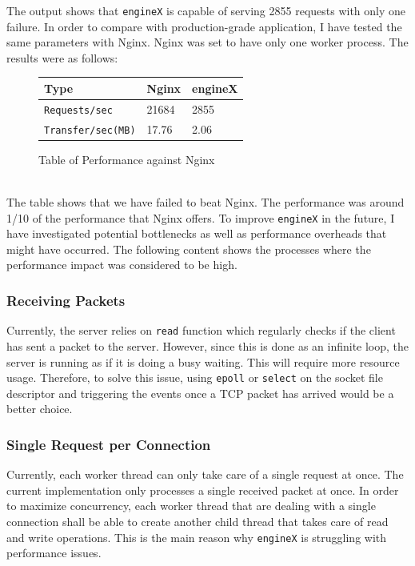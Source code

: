\documentclass{homework}
\begin{document}
The output shows that \texttt{engineX} is capable of serving 2855 requests with only one failure. In order to compare with production-grade application, I have tested the same parameters with Nginx. Nginx was set to have only one worker process. The results were as follows:
\\
\begin{figure}[h]
\begin{center}
\begin{tabular}{|l|l|l|}
    \hline
        \textbf{Type} & \textbf{Nginx} & \textbf{engineX} \\
    \hline
        \texttt{Requests/sec} & 21684 & 2855 \\
        \texttt{Transfer/sec(MB)} & 17.76 & 2.06 \\
    \hline
\end{tabular}
\caption{Table of Performance against Nginx}
\end{center}
\end{figure}
\\
The table shows that we have failed to beat Nginx. The performance was around 1/10 of the performance that Nginx offers. To improve \texttt{engineX} in the future, I have investigated potential bottlenecks as well as performance overheads that might have occurred. The following content shows the processes where the performance impact was considered to be high.

\subsubsection{Receiving Packets}
Currently, the server relies on \texttt{read} function which regularly checks if the client has sent a packet to the server. However, since this is done as an infinite loop, the server is running as if it is doing a busy waiting. This will require more resource usage. Therefore, to solve this issue, using \texttt{epoll} or \texttt{select} on the socket file descriptor and triggering the events once a TCP packet has arrived would be a better choice.

\subsubsection{Single Request per Connection}
Currently, each worker thread can only take care of a single request at once. The current implementation only processes a single received packet at once. In order to maximize concurrency, each worker thread that are dealing with a single connection shall be able to create another child thread that takes care of read and write operations. This is the main reason why \texttt{engineX} is struggling with performance issues.
\end{document}
